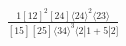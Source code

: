 \documentclass[varwidth, border=5pt]{standalone}
\begin{document}
\begin{my}
$\begin{gathered}
\scriptscriptstyle\frac{1[12]^2[24]⟨24⟩^2⟨23⟩}{[15][25]⟨34⟩^3⟨2|1+5|2]}
\end{gathered}$
\end{my}
\end{document}
